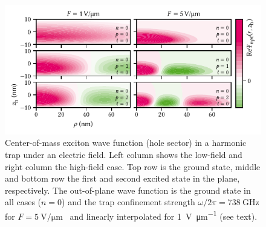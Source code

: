 \begin{figure}
    \centering
    \includegraphics{img/pdf/experiment/wavefunction}
    \caption[]{
        Center-of-mass exciton wave function (hole sector) in a harmonic trap under an electric field.
        Left column shows the low-field and right column the high-field case.
        Top row is the ground state, middle and bottom row the first and second excited state in the plane, respectively.
        The out-of-plane wave function is the ground state in all cases ($n=0$) and the trap confinement strength $\omega/2\pi = \qty{738}{\giga\hertz}$ for $F=\qty{5}{\volt\per\micro\meter}$~\cite[Section~2.2.2]{Descamps2021} and linearly interpolated for \qty{1}{\volt\per\micro\meter} (see text).
    }
    \label{fig:exp:theory:qcse:wf}
\end{figure}

